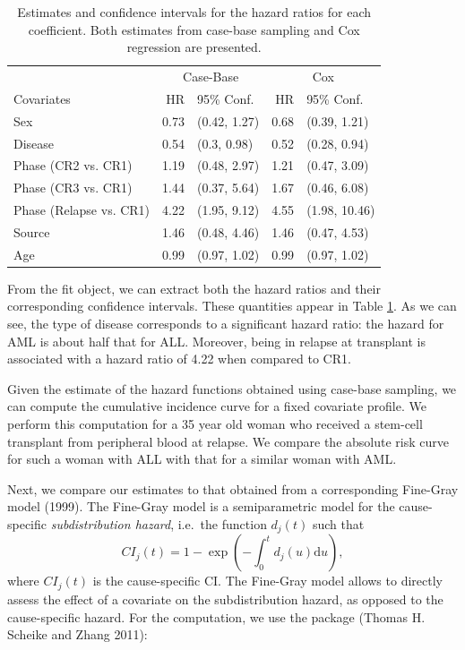 \begin{table}

\caption{\label{tab:bmtcrr-cis}Estimates and confidence intervals for the hazard ratios for each coefficient. Both estimates from case-base sampling and Cox regression are presented.}
\centering
\begin{tabular}[t]{lrlrl}
\toprule
\multicolumn{1}{c}{ } & \multicolumn{2}{c}{Case-Base} & \multicolumn{2}{c}{Cox} \\
\cmidrule(l{3pt}r{3pt}){2-3} \cmidrule(l{3pt}r{3pt}){4-5}
Covariates & HR & 95\% Conf. & HR & 95\% Conf.\\
\midrule
Sex & 0.73 & (0.42, 1.27) & 0.68 & (0.39, 1.21)\\
Disease & 0.54 & (0.3, 0.98) & 0.52 & (0.28, 0.94)\\
Phase (CR2 vs. CR1) & 1.19 & (0.48, 2.97) & 1.21 & (0.47, 3.09)\\
Phase (CR3 vs. CR1) & 1.44 & (0.37, 5.64) & 1.67 & (0.46, 6.08)\\
Phase (Relapse vs. CR1) & 4.22 & (1.95, 9.12) & 4.55 & (1.98, 10.46)\\
\addlinespace
Source & 1.46 & (0.48, 4.46) & 1.46 & (0.47, 4.53)\\
Age & 0.99 & (0.97, 1.02) & 0.99 & (0.97, 1.02)\\
\bottomrule
\end{tabular}
\end{table}

From the fit object, we can extract both the hazard ratios and their corresponding confidence intervals. These quantities appear in Table \ref{tab:bmtcrr-cis}. As we can see, the type of disease corresponds to a significant hazard ratio: the hazard for AML is about half that for ALL. Moreover, being in relapse at transplant is associated with a hazard ratio of 4.22 when compared to CR1.

Given the estimate of the hazard functions obtained using case-base sampling, we can compute the cumulative incidence curve for a fixed covariate profile. We perform this computation for a 35 year old woman who received a stem-cell transplant from peripheral blood at relapse. We compare the absolute risk curve for such a woman with ALL with that for a similar woman with AML.

Next, we compare our estimates to that obtained from a corresponding Fine-Gray model (1999). The Fine-Gray model is a semiparametric model for the cause-specific \emph{subdistribution hazard}, i.e.~the function \(d_j(t)\) such that
\[CI_j(t) = 1 - \exp\left( - \int_0^t d_j(u) \textrm{d}u \right),\]
where \(CI_j(t)\) is the cause-specific CI. The Fine-Gray model allows to directly assess the effect of a covariate on the subdistribution hazard, as opposed to the cause-specific hazard. For the computation, we use the  package (Thomas H. Scheike and Zhang 2011):

